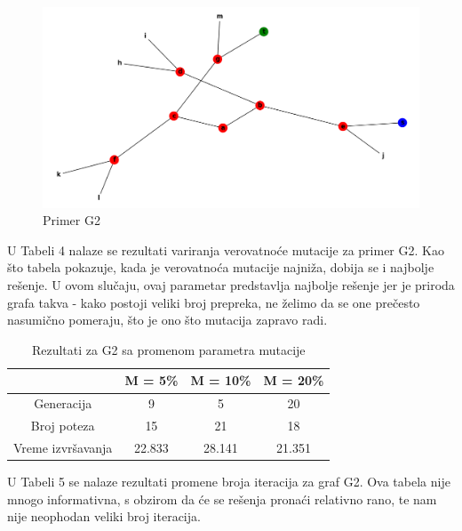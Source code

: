 \documentclass[12pt]{article}
\begin{document}
\begin{figure}[h!]
	\begin{center}
		\includegraphics[scale=0.4]{g2.png}
	\end{center}
	\caption{Primer G2}
	\label{fig:slika3}
\end{figure}

 \par U Tabeli 4 nalaze se rezultati variranja verovatnoće mutacije za primer G2. Kao što tabela pokazuje, kada je verovatnoća mutacije najniža, dobija se i najbolje rešenje. U ovom slučaju, ovaj parametar predstavlja najbolje rešenje jer je priroda grafa takva - kako postoji veliki broj prepreka, ne želimo da se one prečesto nasumično pomeraju, što je ono što mutacija zapravo radi. 

	\begin {table}[H]
	\begin{center}
		\caption {Rezultati za G2 sa promenom parametra mutacije} \label{tab:title} 
		\begin{tabular}{|| c|c c c||} 	
			\hline
			& M = 5\% & M = 10\% & M = 20\% \\ 
			\hline\hline
			Generacija & 9 & 5 & 20  \\ 
			\hline
			Broj poteza & 15 & 21 & 18 \\
			\hline
			Vreme izvršavanja & 22.833 & 28.141 & 21.351 \\
			\hline
		\end{tabular}
	\end{center}
\end{table}

	\par U Tabeli 5 se nalaze rezultati promene broja iteracija za graf G2. Ova tabela nije mnogo informativna, s obzirom da će se rešenja pronaći relativno rano, te nam nije neophodan veliki broj iteracija. 
\end{document}
